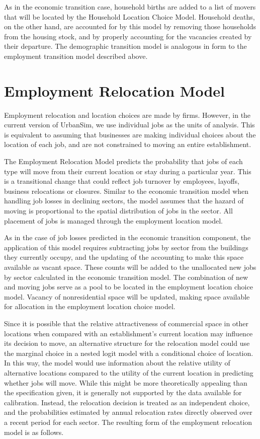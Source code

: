 As in the economic transition case, household births are added to
a list of movers that will be located by the Household Location
Choice Model.  Household deaths, on the other hand, are accounted
for by this model by removing those households from the housing
stock, and by properly accounting for the vacancies created by
their departure.  The demographic transition model is analogous in
form to the employment transition model described above.


\section{Employment Relocation Model}

Employment relocation and location choices are made by firms.
However, in the current version of UrbanSim, we use individual
jobs as the units of analysis.  This is equivalent to assuming
that businesses are making individual choices about the location
of each job, and are not constrained to moving an entire
establishment.

The Employment Relocation Model predicts the probability that jobs
of each type will move from their current location or stay during
a particular year. This is a transitional change that could
reflect job turnover by employees, layoffs, business relocations
or closures. Similar to the economic transition model when
handling job losses in declining sectors, the model assumes that
the hazard of moving is proportional to the spatial distribution
of jobs in the sector.  All placement of jobs is managed through
the employment location model.

As in the case of job losses predicted in the economic transition
component, the application of this model requires subtracting jobs
by sector from the buildings they currently occupy, and the
updating of the accounting to make this space available as vacant
space. These counts will be added to the unallocated new jobs by
sector calculated in the economic transition model. The
combination of new and moving jobs serve as a pool to be located
in the employment location choice model. Vacancy of nonresidential
space will be updated, making space available for allocation in
the employment location choice model.

Since it is possible that the relative attractiveness of
commercial space in other locations when compared with an
establishment's current location may influence its decision to
move, an alternative structure for the relocation model could use
the marginal choice in a nested logit model with a conditional
choice of location. In this way, the model would use information
about the relative utility of alternative locations compared to
the utility of the current location in predicting whether jobs
will move.  While this might be more theoretically appealing than
the specification given, it is generally not supported by the data
available for calibration. Instead, the relocation decision is
treated as an independent choice, and the probabilities estimated
by annual relocation rates directly observed over a recent period
for each sector.  The resulting form of the employment relocation
model is as follows.

